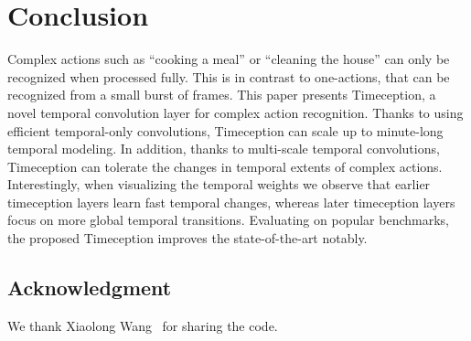 \documentclass[10pt,twocolumn,letterpaper]{article}
\begin{document}
\section{Conclusion}\label{sec:conclusions}
Complex actions such as ``cooking a meal'' or ``cleaning the house'' can only be recognized when processed fully. This is in contrast to one-actions, that can be recognized from a small burst of frames.
This paper presents Timeception, a novel temporal convolution layer for complex action recognition. Thanks to using efficient temporal-only convolutions, Timeception can scale up to minute-long temporal modeling.
In addition, thanks to multi-scale temporal convolutions, Timeception can tolerate the changes in temporal extents of complex actions.
Interestingly, when visualizing the temporal weights we observe that earlier timeception layers learn fast temporal changes, whereas later timeception layers focus on more global temporal transitions.
Evaluating on popular benchmarks, the proposed Timeception improves the state-of-the-art notably.

\subsection*{Acknowledgment}\label{acknowledgement}
We thank Xiaolong Wang~\cite{wang2017non} for sharing the code.

{\small


}
\end{document}
